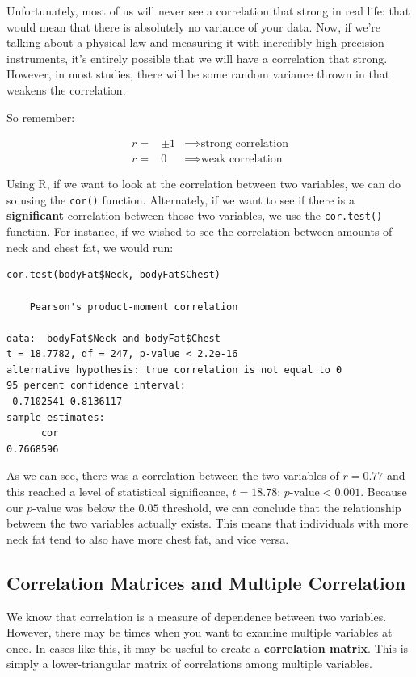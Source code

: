 Unfortunately, most of us will never see a correlation that strong in real life: that would mean that there is absolutely no variance of your data. Now, if we're talking about a physical law and measuring it with incredibly high-precision instruments, it's entirely possible that we will have a correlation that strong. However, in most studies, there will be some random variance thrown in that weakens the correlation.

So remember:

\begin{eqnarray*}
r=& \pm1 &\implies \text{strong correlation} \\
r=& 0 &\implies \text{weak correlation}
\end{eqnarray*}

Using R, if we want to look at the correlation between two variables, we can do so using the \verb|cor()| function. Alternately, if we want to see if there is a \textbf{significant} correlation between those two variables, we use the \verb|cor.test()| function. For instance, if we wished to see the correlation between amounts of neck and chest fat, we would run:

\begin{framed}
\begin{Verbatim}[samepage=TRUE]
cor.test(bodyFat$Neck, bodyFat$Chest)

	Pearson's product-moment correlation

data:  bodyFat$Neck and bodyFat$Chest
t = 18.7782, df = 247, p-value < 2.2e-16
alternative hypothesis: true correlation is not equal to 0
95 percent confidence interval:
 0.7102541 0.8136117
sample estimates:
      cor 
0.7668596 
\end{Verbatim}
\end{framed}

As we can see, there was a correlation between the two variables of $r=0.77$ and this reached a level of statistical significance, $t = 18.78$; $p\text{-value}<0.001$. Because our $p$-value was below the $0.05$ threshold, we can conclude that the relationship between the two variables actually exists. This means that individuals with more neck fat tend to also have more chest fat, and vice versa.

\subsection{Correlation Matrices and Multiple Correlation}
We know that correlation is a measure of dependence between two variables. However, there may be times when you want to examine multiple variables at once. In cases like this, it may be useful to create a \textbf{correlation matrix}. This is simply a lower-triangular matrix of correlations among multiple variables.

